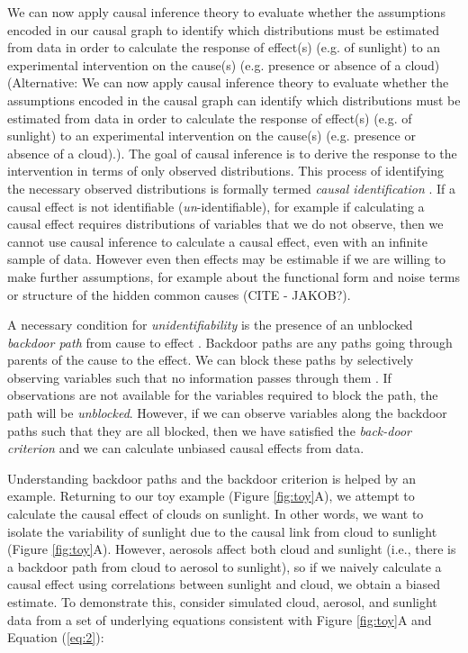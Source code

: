 \documentclass[12pt]{article}
\begin{document}
We can now apply causal inference theory
\citep[e.g.,][]{pearl1995causal,shpitser2006} to evaluate whether the
assumptions encoded in our causal graph to identify which
distributions must be estimated from data in order to calculate the
response of effect(s) (e.g. of sunlight) to an experimental
intervention on the cause(s) (e.g. presence or absence of a cloud)
(Alternative: We can now apply causal inference theory
\citep[e.g.,][]{pearl1995causal,tian2002general} to evaluate whether
the assumptions encoded in the causal graph can identify which
distributions must be estimated from data in order to calculate the
response of effect(s) (e.g. of sunlight) to an experimental
intervention on the cause(s) (e.g. presence or absence of a
cloud).). The goal of causal inference is to derive the response to
the intervention in terms of only observed distributions. This process
of identifying the necessary observed distributions is formally termed
\emph{causal identification} \citep[][, Ch. 3]{pearl2009causality}. If
a causal effect is not identifiable (\emph{un}-identifiable), for
example if calculating a causal effect requires distributions of
variables that we do not observe, then we cannot use causal inference
to calculate a causal effect, even with an infinite sample of
data. However even then effects may be estimable if we are willing to
make further assumptions, for example about the functional form and
noise terms or structure of the hidden common causes (CITE - JAKOB?).

A necessary condition for \emph{unidentifiability} is the presence of
an unblocked \emph{backdoor path} from cause to effect \citep[][,
Ch. 3]{pearl2009causality}. Backdoor paths are any paths going
through parents of the cause to the effect. We can block these paths
by selectively observing variables such that no information passes
through them \citep{geiger-d-sep}. If observations are not available
for the variables required to block the path, the path will be
\emph{unblocked}. However, if we can observe variables along the
backdoor paths such that they are all blocked, then we have satisfied
the \emph{back-door criterion} \citep{pearl2009} and we can calculate
unbiased causal effects from data.

Understanding backdoor paths and the backdoor criterion is helped by
an example. Returning to our toy example (Figure \ref{fig:toy}A), we
attempt to calculate the causal effect of clouds on sunlight. In other
words, we want to isolate the variability of sunlight due to the
causal link from cloud to sunlight (Figure \ref{fig:toy}A). However,
aerosols affect both cloud and sunlight (i.e., there is a backdoor
path from cloud to aerosol to sunlight), so if we naively calculate a
causal effect using correlations between sunlight and cloud, we obtain
a biased estimate. To demonstrate this, consider simulated cloud,
aerosol, and sunlight data from a set of underlying equations
consistent with Figure \ref{fig:toy}A and Equation (\ref{eq:2}):
\end{document}
